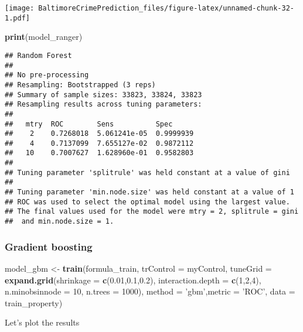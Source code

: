 \documentclass[]{article}
\newenvironment{Shaded}{\begin{snugshade}}{\end{snugshade}}
\newcommand{\KeywordTok}[1]{\textcolor[rgb]{0.13,0.29,0.53}{\textbf{#1}}}
\newcommand{\DataTypeTok}[1]{\textcolor[rgb]{0.13,0.29,0.53}{#1}}
\newcommand{\DecValTok}[1]{\textcolor[rgb]{0.00,0.00,0.81}{#1}}
\newcommand{\FloatTok}[1]{\textcolor[rgb]{0.00,0.00,0.81}{#1}}
\newcommand{\StringTok}[1]{\textcolor[rgb]{0.31,0.60,0.02}{#1}}
\newcommand{\NormalTok}[1]{#1}
\begin{document}
\texttt{[image: BaltimoreCrimePrediction\_files/figure-latex/unnamed-chunk-32-1.pdf]}

\begin{Shaded}
\begin{Highlighting}[]
\KeywordTok{print}\NormalTok{(model_ranger)}
\end{Highlighting}
\end{Shaded}

\begin{verbatim}
## Random Forest 
## 
## No pre-processing
## Resampling: Bootstrapped (3 reps) 
## Summary of sample sizes: 33823, 33824, 33823 
## Resampling results across tuning parameters:
## 
##   mtry  ROC        Sens          Spec     
##    2    0.7268018  5.061241e-05  0.9999939
##    4    0.7137099  7.655127e-02  0.9872112
##   10    0.7007627  1.628960e-01  0.9582803
## 
## Tuning parameter 'splitrule' was held constant at a value of gini
## 
## Tuning parameter 'min.node.size' was held constant at a value of 1
## ROC was used to select the optimal model using the largest value.
## The final values used for the model were mtry = 2, splitrule = gini
##  and min.node.size = 1.
\end{verbatim}

\subsubsection{Gradient boosting}\label{gradient-boosting}

\begin{Shaded}
\begin{Highlighting}[]
\NormalTok{model_gbm <-}\StringTok{ }\KeywordTok{train}\NormalTok{(formula_train, }\DataTypeTok{trControl =}\NormalTok{ myControl, }\DataTypeTok{tuneGrid =} \KeywordTok{expand.grid}\NormalTok{(}\DataTypeTok{shrinkage =} \KeywordTok{c}\NormalTok{(}\FloatTok{0.01}\NormalTok{,}\FloatTok{0.1}\NormalTok{,}\FloatTok{0.2}\NormalTok{), }\DataTypeTok{interaction.depth =} \KeywordTok{c}\NormalTok{(}\DecValTok{1}\NormalTok{,}\DecValTok{2}\NormalTok{,}\DecValTok{4}\NormalTok{), }\DataTypeTok{n.minobsinnode =} \DecValTok{10}\NormalTok{, }\DataTypeTok{n.trees =} \DecValTok{1000}\NormalTok{),}
                      \DataTypeTok{method =} \StringTok{'gbm'}\NormalTok{,}\DataTypeTok{metric =} \StringTok{'ROC'}\NormalTok{, }\DataTypeTok{data =}\NormalTok{ train_property)}
\end{Highlighting}
\end{Shaded}

Let's plot the results
\end{document}

